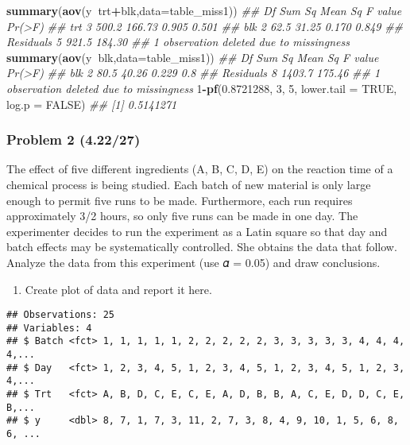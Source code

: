 \documentclass[]{article}
\newenvironment{Shaded}{\begin{snugshade}}{\end{snugshade}}
\newcommand{\CommentTok}[1]{\textcolor[rgb]{0.56,0.35,0.01}{\textit{#1}}}
\newcommand{\DataTypeTok}[1]{\textcolor[rgb]{0.13,0.29,0.53}{#1}}
\newcommand{\DecValTok}[1]{\textcolor[rgb]{0.00,0.00,0.81}{#1}}
\newcommand{\FloatTok}[1]{\textcolor[rgb]{0.00,0.00,0.81}{#1}}
\newcommand{\KeywordTok}[1]{\textcolor[rgb]{0.13,0.29,0.53}{\textbf{#1}}}
\newcommand{\NormalTok}[1]{#1}
\newcommand{\OperatorTok}[1]{\textcolor[rgb]{0.81,0.36,0.00}{\textbf{#1}}}
\newcommand{\OtherTok}[1]{\textcolor[rgb]{0.56,0.35,0.01}{#1}}
\providecommand{\tightlist}{%
  \setlength{\itemsep}{0pt}\setlength{\parskip}{0pt}}
\begin{document}
\begin{Shaded}
\begin{Highlighting}[]
\KeywordTok{summary}\NormalTok{(}\KeywordTok{aov}\NormalTok{(y}\OperatorTok{~}\NormalTok{trt}\OperatorTok{+}\NormalTok{blk,}\DataTypeTok{data=}\NormalTok{table_miss1))}
\CommentTok{##             Df Sum Sq Mean Sq F value Pr(>F)}
\CommentTok{## trt          3  500.2  166.73   0.905  0.501}
\CommentTok{## blk          2   62.5   31.25   0.170  0.849}
\CommentTok{## Residuals    5  921.5  184.30               }
\CommentTok{## 1 observation deleted due to missingness}
\KeywordTok{summary}\NormalTok{(}\KeywordTok{aov}\NormalTok{(y}\OperatorTok{~}\NormalTok{blk,}\DataTypeTok{data=}\NormalTok{table_miss1))}
\CommentTok{##             Df Sum Sq Mean Sq F value Pr(>F)}
\CommentTok{## blk          2   80.5   40.26   0.229    0.8}
\CommentTok{## Residuals    8 1403.7  175.46               }
\CommentTok{## 1 observation deleted due to missingness}
\DecValTok{1}\OperatorTok{-}\KeywordTok{pf}\NormalTok{(}\FloatTok{0.8721288}\NormalTok{, }\DecValTok{3}\NormalTok{, }\DecValTok{5}\NormalTok{, }\DataTypeTok{lower.tail =} \OtherTok{TRUE}\NormalTok{, }\DataTypeTok{log.p =} \OtherTok{FALSE}\NormalTok{)}
\CommentTok{## [1] 0.5141271}
\end{Highlighting}
\end{Shaded}

\hypertarget{problem-2-4.2227}{%
\subsubsection{Problem 2 (4.22/27)}\label{problem-2-4.2227}}

The effect of five different ingredients (A, B, C, D, E) on the reaction
time of a chemical process is being studied. Each batch of new material
is only large enough to permit five runs to be made. Furthermore, each
run requires approximately 3/2 hours, so only five runs can be made in
one day. The experimenter decides to run the experiment as a Latin
square so that day and batch effects may be systematically controlled.
She obtains the data that follow. Analyze the data from this experiment
(use 𝛼 = 0.05) and draw conclusions.

\begin{enumerate}
\def\labelenumi{(\alph{enumi})}
\tightlist
\item
  Create plot of data and report it here.
\end{enumerate}

\begin{verbatim}
## Observations: 25
## Variables: 4
## $ Batch <fct> 1, 1, 1, 1, 1, 2, 2, 2, 2, 2, 3, 3, 3, 3, 3, 4, 4, 4, 4,...
## $ Day   <fct> 1, 2, 3, 4, 5, 1, 2, 3, 4, 5, 1, 2, 3, 4, 5, 1, 2, 3, 4,...
## $ Trt   <fct> A, B, D, C, E, C, E, A, D, B, B, A, C, E, D, D, C, E, B,...
## $ y     <dbl> 8, 7, 1, 7, 3, 11, 2, 7, 3, 8, 4, 9, 10, 1, 5, 6, 8, 6, ...
\end{verbatim}
\end{document}
